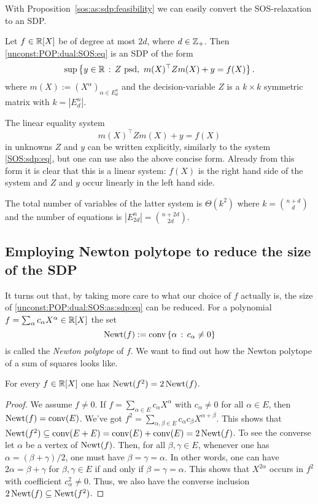 With Proposition~\ref{sos:as:sdp:feasibility} we can easily convert the SOS-relaxation to an SDP. 

\begin{corollary}
	Let $f \in \mathbb{R}[X]$ be of degree at most $2 d$, where $d \in \mathbb{Z}_+$. Then \eqref{unconst:POP:dual:SOS:eq} is an SDP of the form
	\begin{equation}
		\sup \left\{ y \in \mathbb{R} \,:\, Z \ \text{psd}, \  m(X)^\top Z m(X) + y = f(X) \right\}. \label{unconst:POP:dual:SOS:as:sdp:eq}
	\end{equation}
	where $m(X) := (X^\alpha)_{\alpha \in E^n_d}$ and the decision-variable $Z$ is a $k \times k$ symmetric matrix with $k=|E^n_d|$. 
\end{corollary}

The linear equality system 
\[
	m(X)^\top Z m(X) + y = f(X)
\]
in unknowns $Z$ and $y$ can be written explicitly, similarly to the system \eqref{SOS:sdp:eq}, but one can use also the above concise form. Already from this form it is clear that this is a linear system: $f(X)$ is the right hand side of the system and $Z$ and $y$ occur linearly in the left hand side.

The total number of variables of the latter system is \(\Theta(k^2)\) where $k = \binom{n+d}{d}$ and the number of equations is $|E_{2d}^n| = \binom{n+2d}{2d}$. 

\subsection{Employing Newton polytope to reduce the size of the SDP} 

It turns out that, by taking more care to what our choice of $f$ actually is, the size of \eqref{unconst:POP:dual:SOS:as:sdp:eq} can be reduced. For a polynomial $f = \sum_\alpha c_\alpha X^\alpha \in \mathbb{R}[X]$ the set 
\[
	\operatorname{Newt}(f) := \operatorname{conv} \left\{  \alpha  \,:\, c_\alpha \ne 0 \right\}
\]
is called the \emph{Newton polytope} of $f$. We want to find out how the Newton polytope of a sum of squares looks like.  

\begin{lemma}
	\label{Newton:of:square}
	For every $f \in \mathbb{R}[X]$ one has $\operatorname{Newt}(f^2) = 2 \operatorname{Newt}(f)$. 
\end{lemma}
\begin{proof}
	We assume $f \ne 0$. If $f = \sum_{\alpha \in E} c_\alpha X^\alpha$ with $c_\alpha \ne 0$ for all $\alpha \in E$, then $\operatorname{Newt}(f) = \operatorname{conv}(E)$. We've got $f^2 = \sum_{\alpha, \beta \in E} c_\alpha c_\beta X^{\alpha + \beta}$. This shows that $\operatorname{Newt}(f^2) \subseteq \operatorname{conv}(E+E) = \operatorname{conv}(E)+\operatorname{conv}(E) = 2 \operatorname{Newt}(f)$. To see the converse let $\alpha$ be a vertex of $\operatorname{Newt}(f)$. Then, for all $\beta,\gamma \in E$, whenever one has $\alpha = (\beta+ \gamma)/2$, one must have $\beta=\gamma=\alpha$. In other words, one can have $2 \alpha = \beta + \gamma$ for $\beta,\gamma \in E$ if and only if $\beta=\gamma=\alpha$. This shows that $X^{2\alpha}$ occurs in $f^2$ with coefficient $c_\alpha^2 \ne 0$. Thus, we also have the converse inclusion $2 \operatorname{Newt}(f) \subseteq \operatorname{Newt}(f^2)$. 
\end{proof}

